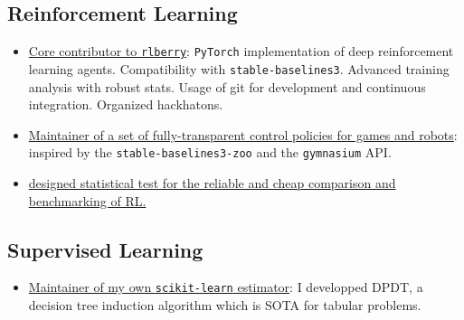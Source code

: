 \subsection*{Reinforcement Learning}
\begin{itemize}
    \item[] \href{https://rlberry-py.github.io/rlberry/about.html#contributors}{Core contributor to \texttt{rlberry}}: \texttt{PyTorch} implementation of deep reinforcement learning agents. Compatibility with \texttt{stable-baselines3}. Advanced training analysis with robust stats. Usage of git for development and continuous integration. Organized hackhatons.
    \item[] \href{https://github.com/KohlerHECTOR/interpretable-rl-zoo}{Maintainer of a set of fully-transparent control policies for games and robots}: inspired by the \texttt{stable-baselines3-zoo} and the \texttt{gymnasium} API.
    \item[] \href{https://github.com/TimotheeMathieu/adastop}{designed statistical test for the reliable and cheap comparison and benchmarking of RL.}
\end{itemize}


\subsection*{Supervised Learning}

\begin{itemize}
    \item[] \href{https://github.com/KohlerHECTOR/DPDTreeEstimator}{Maintainer of my own \texttt{scikit-learn} estimator}: I developped DPDT, a decision tree induction algorithm which is SOTA for tabular problems. 
\end{itemize}

